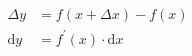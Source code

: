 \begin{equation}
\begin{split}
    \Delta y &= f(x + \Delta x) - f(x) \\
    \mathrm{d}y &= f^{\prime}(x) \cdot \mathrm{d}x
\end{split}
\end{equation}